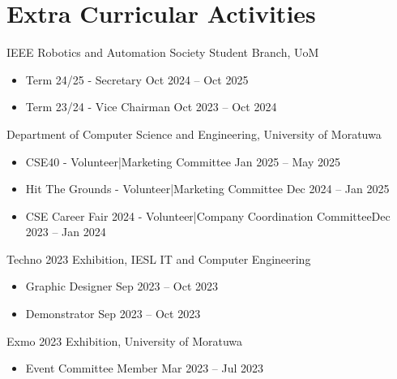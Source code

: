 \vspace{3pt}
\section{Extra Curricular Activities}
\vspace{3pt}
\resumeSubHeadingListStart
  \resumeSubheading
    {IEEE Robotics and Automation Society Student Branch, UoM}
    {}{}{}
    \vspace{-20pt}
    \begin{itemize}
    \item Term 24/25 - Secretary  \hfill Oct 2024 -- Oct 2025\\
    \item Term 23/24 - Vice Chairman  \hfill Oct 2023 -- Oct 2024\\
    \end{itemize}
\vspace{3pt}

  \resumeSubheading
    {Department of Computer Science and Engineering, University of Moratuwa}{}{}{}
     \vspace{-20pt}
    \begin{itemize}
    \item CSE40 - Volunteer|Marketing Committee \hfill Jan 2025 -- May 2025\\
    \item Hit The Grounds - Volunteer|Marketing Committee \hfill Dec 2024 -- Jan 2025\\
    \item CSE Career Fair 2024 - Volunteer|Company Coordination Committee\hfill Dec 2023 -- Jan 2024\\
    \end{itemize}
\vspace{3pt}

  \resumeSubheading
    {Techno 2023 Exhibition, IESL IT and Computer Engineering}{}{}{}
    \vspace{-20pt}
    \begin{itemize}
    \item Graphic Designer \hfill Sep 2023 -- Oct 2023\\
    \item Demonstrator \hfill Sep 2023 -- Oct 2023\\
    \end{itemize}
\vspace{3pt}

  \resumeSubheading
    {Exmo 2023 Exhibition, University of Moratuwa}{}{}{}
     \vspace{-20pt}
    \begin{itemize}
    \item Event Committee Member \hfill Mar 2023 --  Jul 2023\\
    \end{itemize}
\vspace{3pt}

\resumeSubHeadingListEnd
